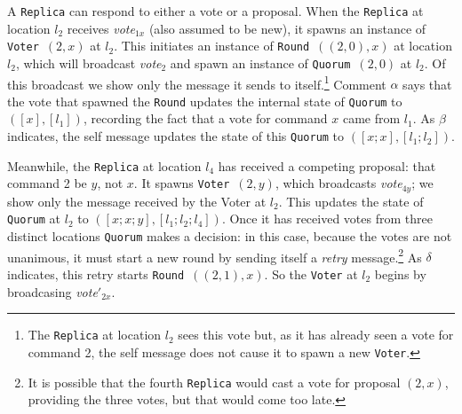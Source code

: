 \documentclass[final]{article}
\begin{document}
A \lstinline{Replica} can respond to either a vote or a proposal.
When the \lstinline{Replica} at location $l_2$ receives
\emph{vote}$_{1x}$ (also assumed to be new), it spawns an instance of
\lstinline{Voter}~$(2,x)$ at $l_2$.  This initiates an instance of
\lstinline{Round}~$((2,0),x)$ at location $l_2$, which will broadcast
\emph{vote}$_2$ and spawn an instance of \lstinline{Quorum}~$(2,0)$ at
$l_2$.  Of this broadcast we show only the message it sends to
itself.\footnote{The \lstinline{Replica} at location $l_2$ sees this
  vote but, as it has already seen a vote for command 2, the self
  message does not cause it to spawn a new \lstinline{Voter}.}
Comment $\alpha$ says that the vote that spawned the \lstinline{Round}
updates the internal state of \lstinline{Quorum} to $([x],[l_1])$,
recording the fact that a vote for command $x$ came from $l_1$.  As
$\beta$ indicates, the self message updates the state of this
\lstinline{Quorum} to $([x;x],[l_1;l_2])$.

Meanwhile, the \lstinline{Replica} at location $l_4$ has received a
competing proposal: that command 2 be $y$, not $x$.  It spawns
\lstinline{Voter}~$(2,y)$, which broadcasts \emph{vote}$_{4y}$; we
show only the message received by the Voter at $l_2$.  This updates
the state of \lstinline{Quorum} at $l_2$ to $([x;x;y],[l_1;l_2;l_4])$.
Once it has received votes from three distinct locations
\lstinline{Quorum} makes a decision: in this case, because the votes
are not unanimous, it must start a new round by sending itself a
\emph{retry} message.\footnote{It is possible that the fourth
  \lstinline{Replica} would cast a vote for proposal $(2,x)$,
  providing the three votes, but that would come too late.}  As
$\delta$ indicates, this retry starts \lstinline{Round}~$((2,1),x)$.
So the \lstinline{Voter} at $l_2$ begins by broadcasing
\emph{vote}$'_{2x}$.
\end{document}
